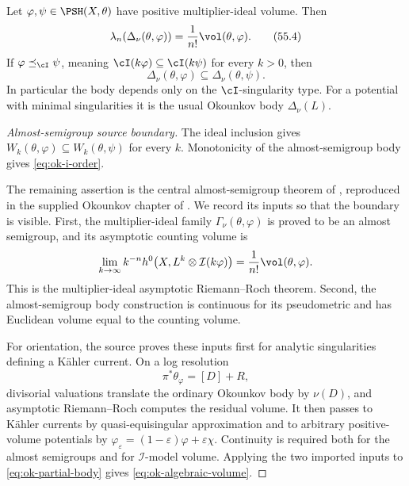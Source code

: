 
\begin{theorem}\label{thm:ok-algebraic-volume-order}
Let \(\varphi,\psi\in\PSH(X,\theta)\) have positive multiplier-ideal
volume.
Then
\[
 \lambda_n\!\left(\Delta_\nu(\theta,\varphi)\right)
     =\frac1{n!}\vol(\theta,\varphi).
\tag{55.4}\label{eq:ok-algebraic-volume}
\]
If
\(\varphi\preceq_{\cI}\psi\), meaning
\(\cI(k\varphi)\subseteq\cI(k\psi)\) for every \(k>0\), then
\[
 \Delta_\nu(\theta,\varphi)
       \subseteq\Delta_\nu(\theta,\psi).
\tag{55.5}\label{eq:ok-i-order}
\]
In particular the body depends only on the \(\cI\)-singularity type.
For a potential with minimal singularities it is the usual Okounkov body
\(\Delta_\nu(L)\).
\end{theorem}

\begin{proof}[Almost-semigroup source boundary]
The ideal inclusion gives
\(W_k(\theta,\varphi)\subseteq W_k(\theta,\psi)\) for every \(k\).
Monotonicity of the almost-semigroup body gives
\eqref{eq:ok-i-order}.

The remaining assertion is the central almost-semigroup theorem of
\cite{Xia21}, reproduced in the supplied Okounkov chapter of
\cite{XiaBook}.  We record its inputs so that the boundary is visible.
First, the multiplier-ideal family
\(\Gamma_\nu(\theta,\varphi)\) is proved to be an almost semigroup, and its
asymptotic counting volume is
\[
 \lim_{k\to\infty}k^{-n}
 h^0\!\left(X,L^k\otimes\mathcal I(k\varphi)\right)
 =\frac1{n!}\vol(\theta,\varphi).
\]
This is the multiplier-ideal asymptotic Riemann--Roch theorem.  Second, the
almost-semigroup body construction is continuous for its pseudometric and
has Euclidean volume equal to the counting volume.

For orientation, the source proves these inputs first for analytic
singularities defining a K\"ahler current.  On a log resolution
\[
                   \pi^*\theta_\varphi=[D]+R,
\tag{55.6}\label{eq:ok-log-resolution}
\]
divisorial valuations translate the ordinary Okounkov body by
\(\nu(D)\), and asymptotic Riemann--Roch computes the residual volume.  It
then passes to K\"ahler currents by quasi-equisingular approximation and
to arbitrary positive-volume potentials by
\(\varphi_\varepsilon=(1-\varepsilon)\varphi+\varepsilon\chi\).
Continuity is required both for the almost semigroups and for
\(\mathcal I\)-model volume.  Applying the two imported inputs to
\eqref{eq:ok-partial-body} gives
\eqref{eq:ok-algebraic-volume}.
\end{proof}

